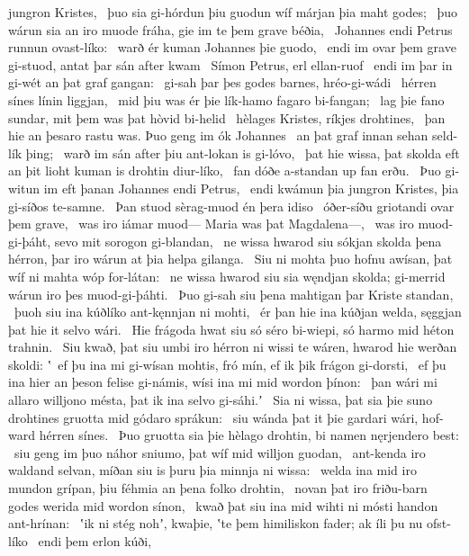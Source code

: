 jungron Kristes, \hld\ þuo sia gi-hórdun þiu guodun wíf
márjan þia maht godes; \hld\ þuo wárun sia an iro muode fráha,
gie im te þem grave béðia, \hld\ Johannes endi Petrus
runnun ovast-líko: \hld\ warð ér kuman
Johannes þie guodo, \hld\ endi im ovar þem grave gi-stuod,
antat þar sán after kwam \hld\ Símon Petrus,
erl ellan-ruof \hld\ endi im þar in gi-wét
an þat graf gangan: \hld\ gi-sah þar þes godes barnes,
hréo-gi-wádi \hld\ hérren sínes
línin liggjan, \hld\ mid þiu was ér þie lík-hamo
fagaro bi-fangan; \hld\ lag þie fano sundar,
mit þem was þat hòvid bi-helid \hld\ hèlages Kristes,
ríkjes drohtines, \hld\ þan hie an þesaro rastu was.
Þuo geng im ók Johannes \hld\ an þat graf innan
sehan seld-lík þing; \hld\ warð im sán after þiu
ant-lokan is gi-lóvo, \hld\ þat hie wissa, þat skolda eft an þit lioht kuman
is drohtin diur-líko, \hld\ fan dóðe a-standan
up fan erðu. \hld\ Þuo gi-witun im eft þanan
Johannes endi Petrus, \hld\ endi kwámun þia jungron Kristes,
þia gi-síðos te-samne. \hld\ Þan stuod sèrag-muod
én þera idiso \hld\ óðer-síðu
griotandi ovar þem grave, \hld\ was iro iámar muod—
Maria was þat Magdalena—, \hld\ was iro muod-gi-þáht,
sevo mit sorogon gi-blandan, \hld\ ne wissa hwarod siu sókjan skolda
þena hérron, þar iro wárun at þia helpa gilanga. \hld\ Siu ni mohta þuo hofnu awísan,
þat wíf ni mahta wóp for-látan: \hld\ ne wissa hwarod siu sia węndjan skolda;
gi-merrid wárun iro þes muod-gi-þáhti. \hld\ Þuo gi-sah siu þena mahtigan þar
Kriste standan, \hld\ þuoh siu ina kúðlíko
ant-kęnnjan ni mohti, \hld\ ér þan hie ina kúðjan welda,
sęggjan þat hie it selvo wári. \hld\ Hie frágoda hwat siu só séro bi-wiepi,
só harmo mid héton trahnin. \hld\ Siu kwað, þat siu umbi iro hérron ni wissi
te wáren, hwarod hie werðan skoldi: ʽ\hld\ ef þu ina mi gi-wísan mohtis,
fró mín, ef ik þik frágon gi-dorsti, \hld\ ef þu ina hier an þeson felise gi-námis,
wísi ina mi mid wordon þínon: \hld\ þan wári mi allaro willjono mésta,
þat ik ina selvo gi-sáhi.ʼ \hld\ Sia ni wissa, þat sia þie suno drohtines
gruotta mid gódaro sprákun: \hld\ siu wánda þat it þie gardari wári,
hof-ward hérren sínes. \hld\ Þuo gruotta sia þie hèlago drohtin,
bi namen nęrjendero best: \hld\ siu geng im þuo náhor sniumo,
þat wíf mid willjon guodan, \hld\ ant-kenda iro waldand selvan,
míðan siu is þuru þia minnja ni wissa: \hld\ welda ina mid iro mundon grípan,
þiu féhmia an þena folko drohtin, \hld\ novan þat iro friðu-barn godes
werida mid wordon sínon, \hld\ kwað þat siu ina mid wihti ni mósti
handon ant-hrínan: \hld\ ʽik ni stég nohʼ, kwaþie, ʽte þem himiliskon fader;
ak íli þu nu ofst-líko \hld\ endi þem erlon kúði,
